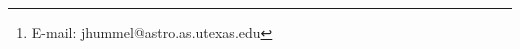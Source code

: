 \author[J.~A. Hummel et al.]
{Jacob~A.~Hummel$^1$\thanks{E-mail: jhummel@astro.as.utexas.edu},
  Athena~Stacy$^2$, and Volker~Bromm$^1$\\
$^1$Department of Astronomy, The University of Texas at Austin, TX 78712, USA\\
$^2$University of California, Berkeley, CA 94720, USA
 }